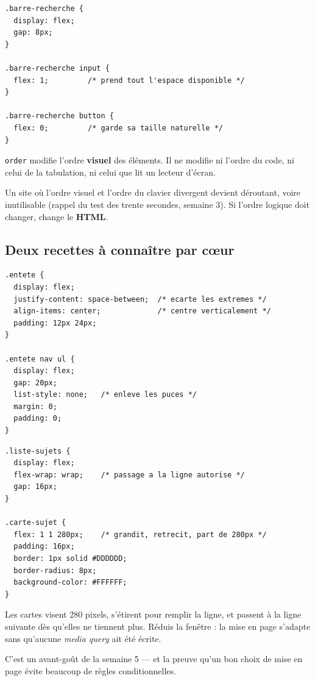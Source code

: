 \documentclass[a4paper,11pt]{article}
\begin{document}
\begin{lstlisting}[language=CSS3, caption={Une barre de recherche qui occupe la place restante}]
.barre-recherche {
  display: flex;
  gap: 8px;
}

.barre-recherche input {
  flex: 1;         /* prend tout l'espace disponible */
}

.barre-recherche button {
  flex: 0;         /* garde sa taille naturelle */
}
\end{lstlisting}

\begin{tcolorbox}[interdit, title={\texttt{order} ne réordonne que pour les yeux}]
\texttt{order} modifie l'ordre \textbf{visuel} des éléments. Il ne modifie ni l'ordre du code, ni celui de la tabulation, ni celui que lit un lecteur d'écran.

\vspace{3pt}
Un site où l'ordre visuel et l'ordre du clavier divergent devient déroutant, voire inutilisable (rappel du test des trente secondes, semaine 3). Si l'ordre logique doit changer, change le \textbf{HTML}.
\end{tcolorbox}

\subsection{Deux recettes à connaître par cœur}

\begin{lstlisting}[language=CSS3, caption={Barre de navigation : logo à gauche, menu à droite}]
.entete {
  display: flex;
  justify-content: space-between;  /* ecarte les extremes */
  align-items: center;             /* centre verticalement */
  padding: 12px 24px;
}

.entete nav ul {
  display: flex;
  gap: 20px;
  list-style: none;   /* enleve les puces */
  margin: 0;
  padding: 0;
}
\end{lstlisting}

\begin{lstlisting}[language=CSS3, caption={Liste de cartes qui passent à la ligne}]
.liste-sujets {
  display: flex;
  flex-wrap: wrap;    /* passage a la ligne autorise */
  gap: 16px;
}

.carte-sujet {
  flex: 1 1 280px;    /* grandit, retrecit, part de 280px */
  padding: 16px;
  border: 1px solid #DDDDDD;
  border-radius: 8px;
  background-color: #FFFFFF;
}
\end{lstlisting}

\begin{tcolorbox}[astuce, title={\texttt{flex: 1 1 280px} est déjà presque du responsive}]
Les cartes visent 280 pixels, s'étirent pour remplir la ligne, et passent à la ligne suivante dès qu'elles ne tiennent plus. Réduis la fenêtre : la mise en page s'adapte sans qu'aucune \textit{media query} ait été écrite.

\vspace{3pt}
C'est un avant-goût de la semaine 5 --- et la preuve qu'un bon choix de mise en page évite beaucoup de règles conditionnelles.
\end{tcolorbox}
\end{document}
